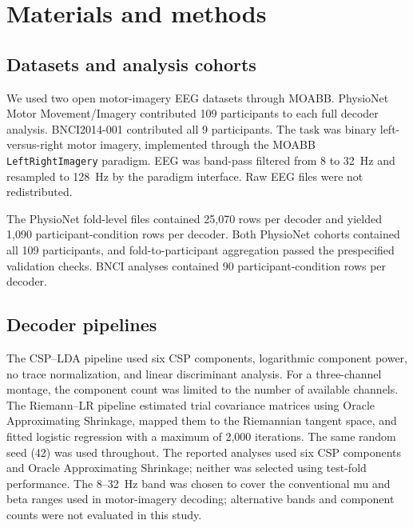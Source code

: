 \documentclass[11pt]{article}
\begin{document}
\section{Materials and methods}
\subsection{Datasets and analysis cohorts}
We used two open motor-imagery EEG datasets through MOABB. PhysioNet Motor Movement/Imagery contributed 109 participants to each full decoder analysis. BNCI2014-001 contributed all 9 participants. The task was binary left-versus-right motor imagery, implemented through the MOABB \texttt{LeftRightImagery} paradigm. EEG was band-pass filtered from 8 to 32~Hz and resampled to 128~Hz by the paradigm interface. Raw EEG files were not redistributed.

The PhysioNet fold-level files contained 25,070 rows per decoder and yielded 1,090 participant-condition rows per decoder. Both PhysioNet cohorts contained all 109 participants, and fold-to-participant aggregation passed the prespecified validation checks. BNCI analyses contained 90 participant-condition rows per decoder.

\subsection{Decoder pipelines}
The CSP--LDA pipeline used six CSP components, logarithmic component power, no trace normalization, and linear discriminant analysis. For a three-channel montage, the component count was limited to the number of available channels. The Riemann--LR pipeline estimated trial covariance matrices using Oracle Approximating Shrinkage, mapped them to the Riemannian tangent space, and fitted logistic regression with a maximum of 2,000 iterations. The same random seed (42) was used throughout. The reported analyses used six CSP components and Oracle Approximating Shrinkage; neither was selected using test-fold performance. The 8--32~Hz band was chosen to cover the conventional mu and beta ranges used in motor-imagery decoding; alternative bands and component counts were not evaluated in this study.
\end{document}
